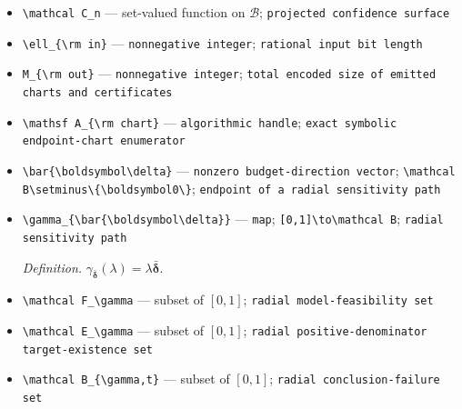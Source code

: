 \documentclass{article}
\begin{document}
\begin{itemize}
  \item \texttt{\textbackslash{}\allowbreak{}mathcal C\_\allowbreak{}n} --- set-valued function on \(\mathcal B\); \texttt{projected confidence surface}
  \item \texttt{\textbackslash{}\allowbreak{}ell\_\allowbreak{}\{\textbackslash{}\allowbreak{}rm in\}\allowbreak{}} --- \texttt{nonnegative integer}; \texttt{rational input bit length}
  \item \texttt{M\_\allowbreak{}\{\textbackslash{}\allowbreak{}rm out\}\allowbreak{}} --- \texttt{nonnegative integer}; \texttt{total encoded size of emitted charts and certificates}
  \item \texttt{\textbackslash{}\allowbreak{}mathsf A\_\allowbreak{}\{\textbackslash{}\allowbreak{}rm chart\}\allowbreak{}} --- \texttt{algorithmic handle}; \texttt{exact symbolic endpoint-\allowbreak{}chart enumerator}
  \item \texttt{\textbackslash{}\allowbreak{}bar\{\textbackslash{}\allowbreak{}boldsymbol\textbackslash{}\allowbreak{}delta\}\allowbreak{}} --- \texttt{nonzero budget-\allowbreak{}direction vector}; \texttt{\textbackslash{}\allowbreak{}mathcal B\textbackslash{}\allowbreak{}setminus\textbackslash{}\allowbreak{}\{\textbackslash{}\allowbreak{}boldsymbol0\textbackslash{}\allowbreak{}\}\allowbreak{}}; \texttt{endpoint of a radial sensitivity path}
  \item \texttt{\textbackslash{}\allowbreak{}gamma\_\allowbreak{}\{\textbackslash{}\allowbreak{}bar\{\textbackslash{}\allowbreak{}boldsymbol\textbackslash{}\allowbreak{}delta\}\allowbreak{}\}\allowbreak{}} --- \texttt{map}; \texttt{[0,\allowbreak{}1]\textbackslash{}\allowbreak{}to\textbackslash{}\allowbreak{}mathcal B}; \texttt{radial sensitivity path}
  \par\smallskip\noindent\emph{Definition.} \(\gamma_{\bar{\boldsymbol\delta}}(\lambda)=\lambda\bar{\boldsymbol\delta}\).
  \item \texttt{\textbackslash{}\allowbreak{}mathcal F\_\allowbreak{}\textbackslash{}\allowbreak{}gamma} --- subset of \( [0,1] \); \texttt{radial model-\allowbreak{}feasibility set}
  \item \texttt{\textbackslash{}\allowbreak{}mathcal E\_\allowbreak{}\textbackslash{}\allowbreak{}gamma} --- subset of \( [0,1] \); \texttt{radial positive-\allowbreak{}denominator target-\allowbreak{}existence set}
  \item \texttt{\textbackslash{}\allowbreak{}mathcal B\_\allowbreak{}\{\textbackslash{}\allowbreak{}gamma,\allowbreak{}t\}\allowbreak{}} --- subset of \( [0,1] \); \texttt{radial conclusion-\allowbreak{}failure set}

\end{itemize}
\end{document}
